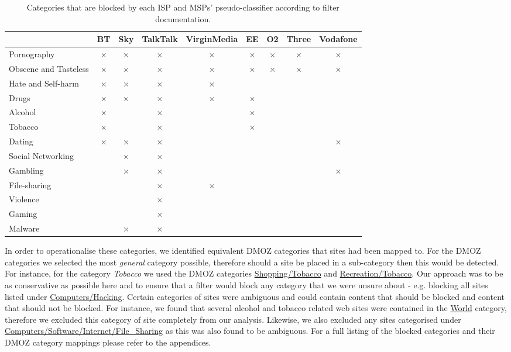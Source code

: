 \documentclass{bmcart}
\begin{document}
\begin{table}[h!]
\caption{Categories that are blocked by each ISP and MSPs' pseudo-classifier according to filter documentation.}
  \begin{tabular}{ l | c c c c | c c c c }
    \hline
	& BT & Sky & TalkTalk & VirginMedia & EE & O2 & Three & Vodafone \\
    \hline
    Pornography & $\times$ & $\times$ & $\times$ & $\times$ & $\times$ & $\times$ & $\times$ & $\times$ \\ 
    Obscene and Tasteless & $\times$ & $\times$ & $\times$ & $\times$ & $\times$ & $\times$ & $\times$ & $\times$ \\
    Hate and Self-harm & $\times$ & $\times$ & $\times$ & $\times$ & \\   
	Drugs & $\times$ & $\times$ & $\times$ & $\times$ & $\times$ \\
	Alcohol & $\times$ & & $\times$ & & $\times$ \\
	Tobacco & $\times$ & & $\times$ & & $\times$ \\	
	Dating & $\times$ & $\times$ & $\times$ & & & & & $\times$ \\
	Social Networking & & $\times$ & $\times$ & & \\
	Gambling & & $\times$ & $\times$ & & & & & $\times$ \\
	File-sharing & & & $\times$ & $\times$ & \\
	Violence & & & $\times$ & & \\
	Gaming & & & $\times$ & & \\
	Malware & & $\times$ & $\times$ & & \\
    \hline
  \end{tabular}
  \label{tab:pseudo_classifiers}
\end{table}

In order to operationalise these categories, we identified equivalent DMOZ categories that sites had been mapped to.
For the DMOZ categories we selected the most \textit{general} category possible, therefore should a site be placed in a sub-category then this would be detected.
For instance, for the category \textit{Tobacco} we used the DMOZ categories \url{Shopping/Tobacco} and \url{Recreation/Tobacco}.
Our approach was to be as conservative as possible here and to ensure that a filter would block any category that we were unsure about - e.g. blocking all sites listed under \url{Computers/Hacking}.
Certain categories of sites were ambiguous and could contain content that should be blocked and content that should not be blocked.
For instance, we found that several alcohol and tobacco related web sites were contained in the \url{World} category, therefore we excluded this category of site completely from our analysis.
Likewise, we also excluded any sites categorised under \url{Computers/Software/Internet/File_Sharing} as this was also found to be ambiguous.
For a full listing of the blocked categories and their DMOZ category mappings please refer to the appendices.
\end{document}
